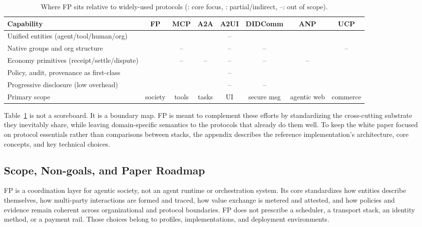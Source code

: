 \documentclass{foundationpaper}
\newcommand{\full}{\ding{51}}
\newcommand{\pmark}{\raisebox{0.2ex}{\small$\circ$}}
\newcommand{\none}{--}
\begin{document}
\begin{table}[!ht]
\centering
\caption{Where FP sits relative to widely-used protocols (\full: core focus, \pmark: partial/indirect, \none: out of scope).}
\label{tab:comparison}
\footnotesize
\begin{tabular}{@{}p{}ccccccc@{}}
\toprule
\textbf{Capability} & \textbf{FP} & \textbf{MCP} & \textbf{A2A} & \textbf{A2UI} & \textbf{DIDComm} & \textbf{ANP} & \textbf{UCP}\\
\midrule
Unified entities (agent/tool/human/org) & \full & \pmark & \pmark & \none & \pmark & \pmark & \pmark \\
Native groups and org structure & \full & \none & \pmark & \none & \none & \pmark & \none \\
Economy primitives (receipt/settle/dispute) & \full & \none & \none & \none & \none & \none & \pmark \\
Policy, audit, provenance as first-class & \full & \pmark & \pmark & \none & \pmark & \pmark & \pmark \\
Progressive disclosure (low overhead) & \full & \pmark & \pmark & \none & \none & \pmark & \pmark \\
Primary scope & society & tools & tasks & UI & secure msg & agentic web & commerce \\
\bottomrule
\end{tabular}
\end{table}

Table~\ref{tab:comparison} is not a scoreboard. It is a boundary map. FP is meant to complement these efforts by standardizing the cross-cutting substrate they inevitably share, while leaving domain-specific semantics to the protocols that already do them well. To keep the white paper focused on protocol essentials rather than comparisons between stacks, the appendix describes the reference implementation's architecture, core concepts, and key technical choices.



\subsection{Scope, Non-goals, and Paper Roadmap}
\label{subsec:scope}

FP is a coordination layer for agentic society, not an agent runtime or orchestration system. Its core standardizes how entities describe themselves, how multi-party interactions are formed and traced, how value exchange is metered and attested, and how policies and evidence remain coherent across organizational and protocol boundaries. FP does not prescribe a scheduler, a transport stack, an identity method, or a payment rail. Those choices belong to profiles, implementations, and deployment environments.
\end{document}
